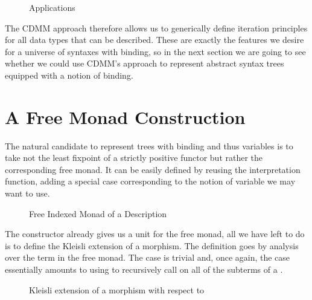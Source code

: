 \begin{figure}[h]
\begin{minipage}{0.5\textwidth}
  \end{minipage}\begin{minipage}{0.5\textwidth}
  \end{minipage}
\caption{Applications\label{fig:appendflatten}}
\end{figure}

The CDMM approach therefore allows us to generically define iteration
principles for all data types that can be described. These are exactly
the features we desire for a universe of syntaxes with binding, so in
the next section we are going to see whether we could use CDMM's approach
to represent abstract syntax trees equipped with a notion of binding.

\section{A Free Monad Construction}

The natural candidate to represent trees with binding and thus variables
is to take not the least fixpoint of a strictly positive functor but
rather the corresponding free monad. It can be easily defined by reusing
the interpretation function, adding a special case corresponding to the
notion of variable we may want to use.

\begin{figure}[h]
  \caption{Free Indexed Monad of a Description\label{fig:datafreemonad}}
\end{figure}

The  constructor already gives us a unit for the free monad,
all we have left to do is to define the Kleisli extension of a morphism.
The definition goes by analysis over the term in the free monad. The
 case is trivial and, once again, the  case
essentially amounts to using  to recursively call 
on all of the subterms of a .

\begin{figure}[h]
  \caption{Kleisli extension of a morphism with respect to ~\label{fig:datakleisli}}
\end{figure}

